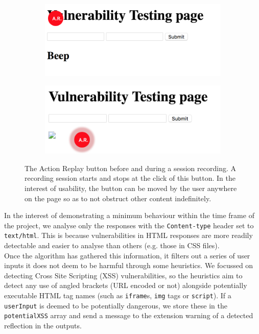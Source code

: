 \begin{figure}[h]
	\centering
	\begin{subfigure}{.5\textwidth}
		\centering
		\includegraphics[width=.8\linewidth]{images/ar_initial.png}
		\label{fig:ar_initial}
	\end{subfigure}%
	\begin{subfigure}{.5\textwidth}
		\centering
		\includegraphics[width=.8\linewidth]{images/ar_recording.png}
		\label{fig:ar_recording}
	\end{subfigure}
	\caption{The Action Replay button before and during a session recording. A recording session starts and stops at the click of this button. In the interest of usability, the button can be moved by the user anywhere on the page so as to not obstruct other content indefinitely.}
	\label{fig:ar_stages}
\end{figure} 

In the interest of demonstrating a minimum behaviour within the time frame of the project, we analyse only the responses with the \texttt{Content-type} header set to \texttt{text/html}. This is because vulnerabilities in HTML responses are more readily detectable and easier to analyse than others (e.g. those in CSS files). \\

Once the algorithm has gathered this information, it filters out a series of user inputs it does not deem to be harmful through some heuristics. We focussed on detecting Cross Site Scripting (XSS) vulnerabilities, so the heuristics aim to detect any use of angled brackets (URL encoded or not) alongside potentially executable HTML tag names (such as \texttt{iframe}s, \texttt{img} tags or \texttt{script}). If a \texttt{userInput} is deemed to be potentially dangerous, we store these in the \texttt{potentialXSS} array and send a message to the extension warning of a detected reflection in the outputs. \\


